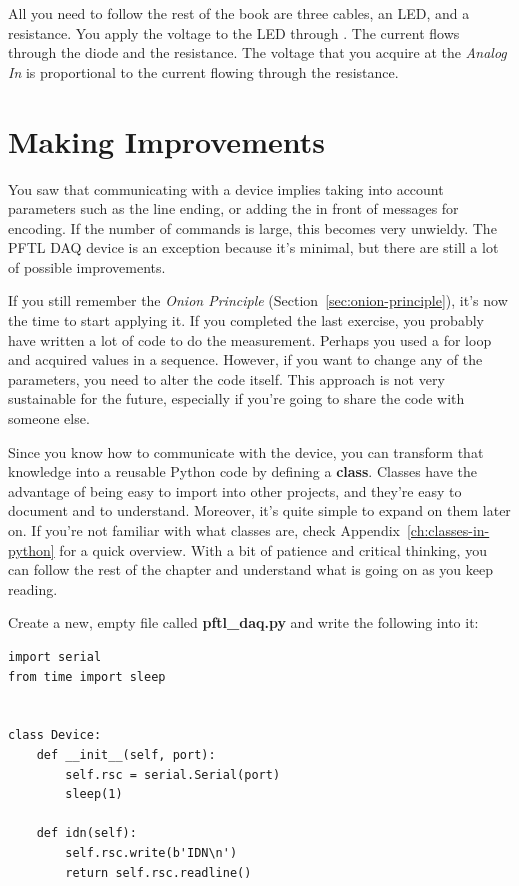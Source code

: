 All you need to follow the rest of the book are three cables, an LED, and a resistance. You apply the voltage to the LED through . The current flows through the diode and the resistance. The voltage that you acquire at the \emph{Analog In}  is proportional to the current flowing through the resistance.


\section{Making Improvements}\label{sec:going-higher-level}
You saw that communicating with a device implies taking into account parameters such as the line ending, or adding the  in front of messages for encoding. If the number of commands is large, this becomes very unwieldy. The {PFTL DAQ} device is an exception because it's minimal, but there are still a lot of possible improvements.

If you still remember the \emph{Onion Principle} (Section~\ref{sec:onion-principle}), it's now the time to start applying it. If you completed the last exercise, you probably have written a lot of code to do the measurement. Perhaps you used a for loop and acquired values in a sequence. However, if you want to change any of the parameters, you need to alter the code itself. This approach is not very sustainable for the future, especially if you're going to share the code with someone else.

Since you know how to communicate with the device, you can transform that knowledge into a reusable Python code by defining a \textbf{class}. Classes have the advantage of being easy to import into other projects, and they're easy to document and to understand. Moreover, it's quite simple to expand on them later on. If you're not familiar with what classes are, check Appendix~\ref{ch:classes-in-python} for a quick overview. With a bit of patience and critical thinking, you can follow the rest of the chapter and understand what is going on as you keep reading.

Create a new, empty file called \textbf{pftl\_daq.py} and write the following into it:

\begin{verbatim}
import serial
from time import sleep


class Device:
    def __init__(self, port):
        self.rsc = serial.Serial(port)
        sleep(1)

    def idn(self):
        self.rsc.write(b'IDN\n')
        return self.rsc.readline()

\end{verbatim}

